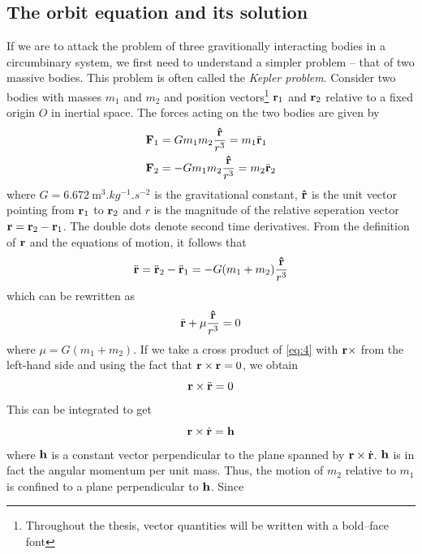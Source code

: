 \subsection{The orbit equation and its solution}
If we are to attack the problem of three gravitionally interacting
bodies in a circumbinary system, we first need to understand a simpler 
problem -- that of two massive bodies. This problem is often called 
the \emph{Kepler problem}. Consider two bodies with masses
$m_1$ and $m_2$ and position vectors\footnote{Throughout the thesis,
vector quantities will be written with a bold--face font}
$\boldsymbol{\mathbf{r}}_1$ and $\boldsymbol{\mathbf{r}}_2$ relative to a fixed origin $O$ in
inertial space. The forces acting on the two bodies are given by
\begin{align}
    \boldsymbol{\mathbf{F}}_1 &= Gm_1m_2 \frac{\boldsymbol{\mathbf{\hat{r}}}}{r^3} = m_1\ddot{\boldsymbol{\mathbf{r}}}_1\\
    \boldsymbol{\mathbf{F}}_2 &= -Gm_1m_2 \frac{\boldsymbol{\mathbf{\hat{r}}}}{r^3}= m_2\ddot{\boldsymbol{\mathbf{r}}}_2
\end{align}
where $G=\SI{6.672}{\meter^3.kg^{-1}.s^{-2}}$ is the gravitational constant,
$\boldsymbol{\mathbf{\hat{r}}}$ is the unit vector pointing from $\boldsymbol{\mathbf{r}}_1$ to $\boldsymbol{\mathbf{r}}_2$
and $r$ is the magnitude of the relative seperation vector 
$\boldsymbol{\mathbf{r}}=\boldsymbol{\mathbf{r}}_2 - \boldsymbol{\mathbf{r}}_1$.
The double dots denote second time derivatives. From the definition of $\boldsymbol{\mathbf{r}}$ 
and the equations of motion, it follows that
\begin{equation}
    \ddot{\boldsymbol{\mathbf{r}}}=\ddot{\boldsymbol{\mathbf{r}}}_2 - \ddot{\boldsymbol{\mathbf{r}}}_1=-G(m_1+m_2)
    \frac{\boldsymbol{\mathbf{\hat{r}}}}{r^3} \\
\end{equation}
which can be rewritten as
\begin{equation}
    \ddot{\boldsymbol{\mathbf{r}}} + \mu \frac{\boldsymbol{\mathbf{\hat{r}}}}{r^3} =0 \label{eq:4}
\end{equation}
where $\mu=G(m_1+m_2)$. If we take a cross product of \cref{eq:4} with
$\boldsymbol{\mathbf{r}}\times$ from the left-hand side and using the fact that 
$\boldsymbol{\mathbf{r}}\times\boldsymbol{\mathbf{r}}=0$, we obtain
\begin{equation}
\boldsymbol{\mathbf{r}}\times\ddot{\boldsymbol{\mathbf{r}}}=0
\end{equation}
This can be integrated to get
\begin{equation}
    \boldsymbol{\mathbf{r}}\times\dot{\boldsymbol{\mathbf{r}}}=\boldsymbol{\mathbf{h}}
    \label{eq:6}
\end{equation}
where $\boldsymbol{\mathbf{h}}$ is a constant vector perpendicular to the plane spanned 
by $\boldsymbol{\mathbf{r}}\times\dot{\boldsymbol{\mathbf{r}}}$. $\boldsymbol{\mathbf{h}}$ is in fact the angular momentum
per unit mass. Thus, the motion of $m_2$
relative to $m_1$ is confined to a plane perpendicular to $\boldsymbol{\mathbf{h}}$. Since 
